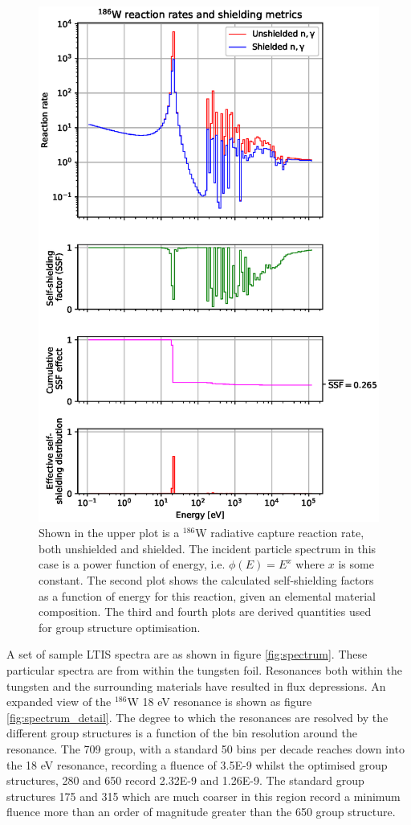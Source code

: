 \begin{figure}[H]
  \centering
  \includegraphics[width=0.8\linewidth]{W186_gamma}
  \caption{Shown in the upper plot is a $^{186}$W radiative capture reaction rate, both unshielded and shielded. The incident particle spectrum in this case is a power function of energy, i.e. $\phi(E) = E^{x}$ where $x$ is some constant. The second plot shows the calculated self-shielding factors as a function of energy for this reaction, given an elemental material composition. The third and fourth plots are derived quantities used for group structure optimisation.}
  \label{fig:w_cross_section}
\end{figure}

A set of sample LTIS spectra are as shown in figure \ref{fig:spectrum}. These particular spectra are from within the tungsten foil. Resonances both within the tungsten and the surrounding materials have resulted in flux depressions. An expanded view of the $^{186}$W 18 eV resonance is shown as figure \ref{fig:spectrum_detail}. The degree to which the resonances are resolved by the different group structures is a function of the bin resolution around the resonance. The 709 group, with a standard 50 bins per decade reaches down into the 18 eV resonance, recording a fluence of 3.5E-9 whilst the optimised group structures, 280 and 650 record 2.32E-9 and 1.26E-9. The standard group structures 175 and 315 which are much coarser in this region record a minimum fluence more than an order of magnitude greater than the 650 group structure.


